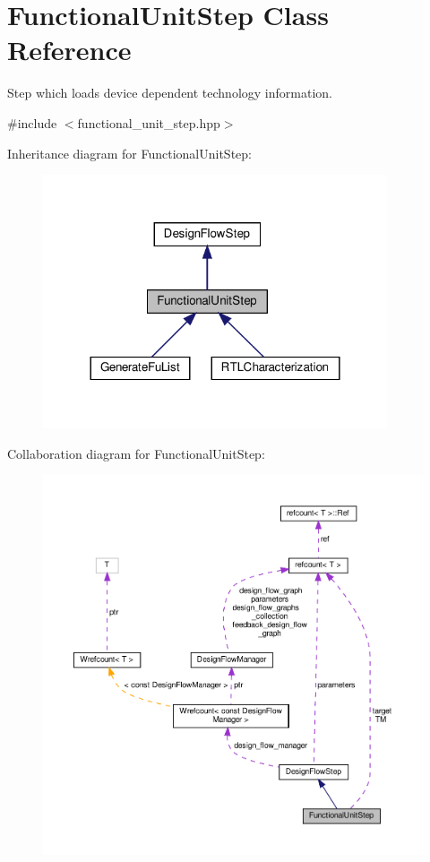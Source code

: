 \hypertarget{classFunctionalUnitStep}{}\section{Functional\+Unit\+Step Class Reference}
\label{classFunctionalUnitStep}


Step which loads device dependent technology information.  




{\ttfamily \#include $<$functional\+\_\+unit\+\_\+step.\+hpp$>$}



Inheritance diagram for Functional\+Unit\+Step\+:
\nopagebreak
\begin{figure}[H]
\begin{center}
\leavevmode
\includegraphics[width=288pt]{da/d48/classFunctionalUnitStep__inherit__graph}
\end{center}
\end{figure}


Collaboration diagram for Functional\+Unit\+Step\+:
\nopagebreak
\begin{figure}[H]
\begin{center}
\leavevmode
\includegraphics[width=350pt]{df/d09/classFunctionalUnitStep__coll__graph}
\end{center}
\end{figure}
